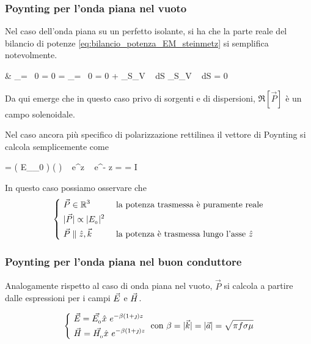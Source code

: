 	\subsubsection{Poynting per l'onda piana nel vuoto}

		Nel caso dell'onda piana su un perfetto isolante, si ha che la parte reale del bilancio di potenze \eqref{eq:bilancio_potenza_EM_steinmetz} si semplifica notevolmente.

		\begin{esp} \label{eq:bilancio_potenza_EM_steinmetz}
			& _{= \, 0  \jt = 0}
				= _{= \, 0  \sigma = 0}
				+ \int_{S_V} \Re[\vec{P}] \cdot {} ~ dS
				\implies \int_{S_V} \Re[\vec{P}] \cdot {} ~ dS = 0
		\end{esp}

		Da qui emerge che in questo caso privo di sorgenti e di dispersioni, $\Re[\vec{P}]$ è un campo solenoidale.

		Nel caso ancora più specifico di polarizzazione rettilinea il vettore di Poynting si calcola semplicemente come
		\begin{esp}
				=  \left( E_{_{0}}  \right) \times \left(   \right)
					~ e^{\jmath \beta z} ~ e^{- \jmath \beta z}
				= \frac{|E_{_{0}}|^2}{2\eta} \hat{z}
				= I \hat{z}
		\end{esp}

		In questo caso possiamo osservare che
		\begin{equation}
			\begin{dcases}
				~ \vec{P} \in \mathbb{R}^3 & \text{ la potenza trasmessa è puramente reale} \\
				~ |\vec{P}| \propto |E_{_{0}}|^2 \\
				~ \vec{P} \parallel \hat{z}, \vec{k} & \text{ la potenza è trasmessa lungo l'asse } \hat{z}
			\end{dcases}
		\end{equation}

	\subsubsection{Poynting per l'onda piana nel buon conduttore}
		Analogamente rispetto al caso di onda piana nel vuoto, $\vec{P}$ si calcola a partire dalle espressioni per i campi $\vec{E}$ e $\vec{H}$.

		\begin{equation}
			\begin{dcases}
				~ \vec{E} = \vec{E_{_{0}}} \hat{x} ~ e^{-\beta(1+\jmath) z} \\
				~ \vec{H} = \vec{H_{_{0}}} \hat{x} ~ e^{-\beta(1+\jmath) z} \\
			\end{dcases}
			\text{ con } \beta = |\vec{k}| = |\vec{a}| = \sqrt{\pi f \sigma \mu}
		\end{equation}

